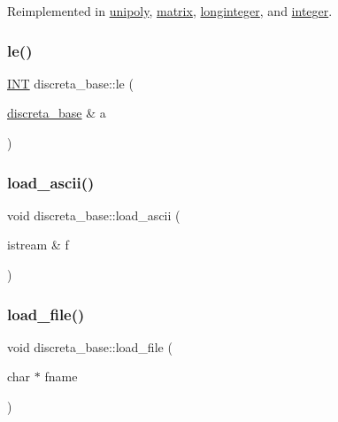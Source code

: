 Reimplemented in \mbox{\hyperlink{classunipoly_a7bff4146466929655bf2bcfd42c682cf}{unipoly}}, \mbox{\hyperlink{classmatrix_a1940fae0fd429e77918eaa3d68cecd12}{matrix}}, \mbox{\hyperlink{classlonginteger_aa40fbd6c28e40a7a19cb29b8999afbc0}{longinteger}}, and \mbox{\hyperlink{classinteger_ab92500013b2342ab5c24355bc91bad64}{integer}}.

\mbox{\label{classdiscreta__base_a2813443682a077fd4112415ee299f087}} 
\subsubsection{\texorpdfstring{le()}{le()}}
{\footnotesize\ttfamily \mbox{\hyperlink{galois_8h_a09fddde158a3a20bd2dcadb609de11dc}{I\+NT}} discreta\+\_\+base\+::le (\begin{DoxyParamCaption}\item[{\mbox{\hyperlink{classdiscreta__base}{discreta\+\_\+base}} \&}]{a }\end{DoxyParamCaption})}

\mbox{\label{classdiscreta__base_a48d7769e2b58ee14dca23bff7bb24fc4}} 
\subsubsection{\texorpdfstring{load\+\_\+ascii()}{load\_ascii()}}
{\footnotesize\ttfamily void discreta\+\_\+base\+::load\+\_\+ascii (\begin{DoxyParamCaption}\item[{istream \&}]{f }\end{DoxyParamCaption})}

\mbox{\label{classdiscreta__base_a73a86b4ef5ef9305667b05003ea1b32e}} 
\subsubsection{\texorpdfstring{load\+\_\+file()}{load\_file()}}
{\footnotesize\ttfamily void discreta\+\_\+base\+::load\+\_\+file (\begin{DoxyParamCaption}\item[{char $\ast$}]{fname }\end{DoxyParamCaption})}

